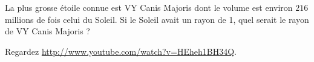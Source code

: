 
\begin{exercice}\label{exosmath-0529}

    La plus grosse étoile connue est VY Canis Majoris dont le volume est environ \( 216\) millions de fois celui du Soleil. Si le Soleil avait un rayon de \unit{1}{\milli\meter}, quel serait le rayon de VY Canis Majoris ?

    Regardez \url{http://www.youtube.com/watch?v=HEheh1BH34Q}.

\end{exercice}

